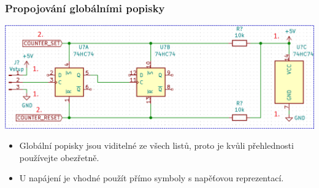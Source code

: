 \documentclass{beamer}
\begin{document}
\begin{frame}
	\frametitle{Propojování globálními popisky}
	
	\begin{center}
		\includegraphics[width=\textwidth]{obr/spoje04.png}
	\end{center}
	
	\small
	
	\begin{itemize}
		\item Globální popisky jsou viditelné ze všech listů, proto je kvůli přehlednosti používejte obezřetně.
		\item U napájení je vhodné použít přímo symboly s napěťovou reprezentací.
	\end{itemize}
	
\end{frame}
\end{document}
